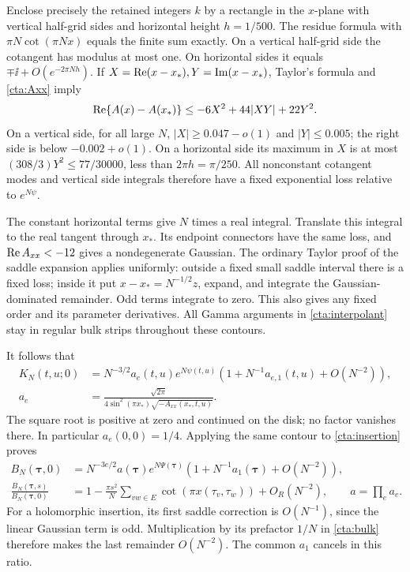Enclose precisely the retained integers \(k\) by a rectangle in
the \(x\)-plane with vertical half-grid sides and horizontal
height \(h=1/500\). The residue formula with
\(\pi N\cot(\pi Nx)\) equals the finite sum exactly.
On a vertical half-grid side the cotangent has modulus at most
one. On horizontal sides it equals \(\mp\ii+O(e^{-2\pi Nh})\).
If \(X=\operatorname{Re}(x-x_*),Y=\operatorname{Im}(x-x_*)\), Taylor's formula and
\eqref{cta:Axx} imply
\begin{equation}\label{cta:contour-bound}
 \operatorname{Re}\{A(x)-A(x_*)\}\le-6X^2+44|XY|+22Y^2.
\end{equation}
On a vertical side, for all large \(N\),
\(|X|\ge0.047-o(1)\) and \(|Y|\le0.005\);
the right side is below \(-0.002+o(1)\).
On a horizontal side its maximum in \(X\) is at most
\((308/3)Y^2\le77/30000\), less than
\(2\pi h=\pi/250\). All nonconstant cotangent modes and
vertical side integrals therefore have a fixed exponential loss
relative to \(e^{N\psi}\).

The constant horizontal terms give \(N\) times a real integral.
Translate this integral to the real tangent through \(x_*\).
Its endpoint connectors have the same loss, and
\(\operatorname{Re} A_{xx}<-12\) gives a nondegenerate Gaussian. The
ordinary Taylor proof of the saddle expansion applies uniformly:
outside a fixed small saddle interval there is a fixed loss;
inside it put \(x-x_*=N^{-1/2}z\), expand, and integrate
the Gaussian-dominated remainder. Odd terms integrate to zero.
This also gives any fixed order and its parameter derivatives.
All Gamma arguments in \eqref{cta:interpolant} stay in regular
bulk strips throughout these contours.

It follows that
\begin{equation}\label{cta:edge-expansion}
 \begin{split}
 K_N(t,u;0)&=N^{-3/2}a_e(t,u)e^{N\psi(t,u)}
                     (1+N^{-1}a_{e,1}(t,u)+O(N^{-2})),\\
 a_e&=\frac{\sqrt{2\pi}}
       {4\sin^2(\pi x_*)\sqrt{-A_{xx}(x_*,t,u)}} .
 \end{split}
\end{equation}
The square root is positive at zero and continued on the disk;
no factor vanishes there. In particular \(a_e(0,0)=1/4\).
Applying the same contour to \eqref{cta:insertion} proves
\begin{equation}\label{cta:packet-expansion}
 \begin{split}
 B_N(\boldsymbol\tau,0)&=
   N^{-3e/2}a(\boldsymbol\tau)e^{N\Psi(\boldsymbol\tau)}
           (1+N^{-1}a_1(\boldsymbol\tau)+O(N^{-2})),\\
 \frac{B_N(\boldsymbol\tau,s)}{B_N(\boldsymbol\tau,0)}
   &=1-\frac{\pi s^2}{N}\sum_{vw\in E}
             \cot(\pi x(\tau_v,\tau_w))+O_R(N^{-2}),
 \qquad a=\prod_e a_e .
 \end{split}
\end{equation}
For a holomorphic insertion, its first saddle correction is
\(O(N^{-1})\), since the linear Gaussian term is odd.
Multiplication by its prefactor \(1/N\) in
\eqref{cta:bulk} therefore makes the last remainder \(O(N^{-2})\).
The common \(a_1\) cancels in this ratio.


